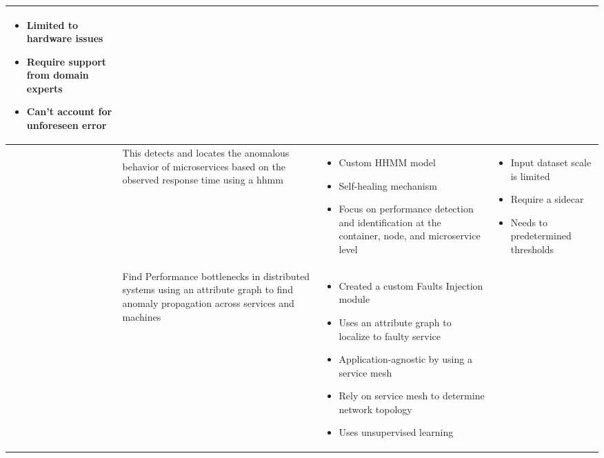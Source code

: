 \begin{longtable}{| p{20mm} | p{43mm} | p{43mm} | p{43mm} |}
\begin{itemize}[leftmargin=*,noitemsep,nolistsep]
    \item Limited to hardware issues
    \item Require support from domain experts
    \item Can't account for unforeseen error
  \vspace{-7mm}
  \end{itemize} \\ \hline
  \cite{samir2019dla} &
  This detects and locates the anomalous behavior of microservices based on the observed response time using a \ac{hhmm} &
  \vspace{-8mm}
  \begin{itemize}[leftmargin=*,noitemsep,nolistsep] 
    \item Custom HHMM model
    \item Self-healing mechanism
    \item Focus on performance detection and identification at the container, node, and microservice level
  \vspace{-7mm}
  \end{itemize} &
  \vspace{-8mm}
  \begin{itemize}[leftmargin=*,noitemsep,nolistsep] 
    \item Input dataset scale is limited
    \item Require a sidecar
    \item Needs to predetermined thresholds
  \vspace{-7mm}
  \end{itemize} \\ \hline
  \cite{wu2020microrca} &
  Find Performance bottlenecks in distributed systems using an attribute graph to find anomaly propagation across services and machines &
  \vspace{-8mm}
  \begin{itemize}[leftmargin=*,noitemsep,nolistsep] 
    \item Created a custom Faults Injection module
    \item Uses an attribute graph to localize to faulty service
    \item Application-agnostic by using a service mesh
    \item Rely on service mesh to determine network topology
    \item Uses unsupervised learning
  \vspace{-7mm}
  \end{itemize} &
  \vspace{-8mm}

\end{longtable}
